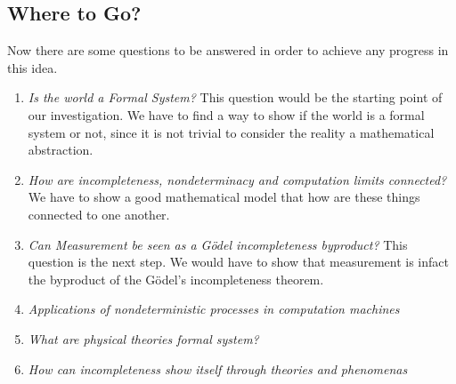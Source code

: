 \documentclass[10pt,a4paper]{article}
\newcounter{theo}
\begin{document}
        \subsection{Where to Go?}
        Now there are some questions to be answered in order to achieve any progress in this idea.
        \begin{enumerate}
            \item \textit{Is the world a Formal System?} This question would be the starting point of our investigation. We have to find a way to show if the world is a formal system or not, since it is not trivial to consider the reality a mathematical abstraction.
            \item \textit{How are incompleteness, nondeterminacy and computation limits connected?} We have to show a good mathematical model that how are these things connected to one another.
            \item \textit{Can Measurement be seen as a Gödel incompleteness byproduct?} This question is the next step. We would have to show that measurement is infact the byproduct of the Gödel's incompleteness theorem.
            \item \textit{Applications of nondeterministic processes in computation machines}
            \item \textit{What are physical theories formal system?}
            \item \textit{How can incompleteness show itself through theories and phenomenas}
        \end{enumerate}

            





                        

                


                    \newpage
                    
                    
            
\end{document}
